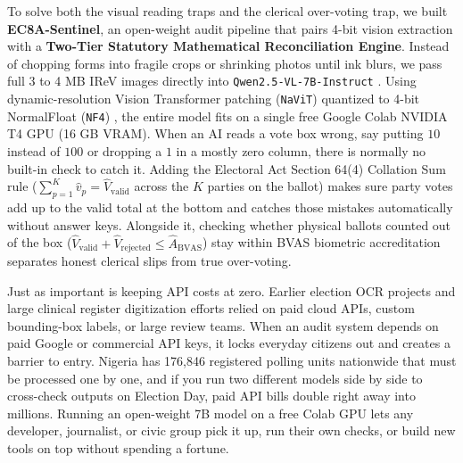 \documentclass{article}
\begin{document}
To solve both the visual reading traps and the clerical over-voting trap, we built \textbf{EC8A-Sentinel}, an open-weight audit pipeline that pairs 4-bit vision extraction with a \textbf{Two-Tier Statutory Mathematical Reconciliation Engine}. Instead of chopping forms into fragile crops or shrinking photos until ink blurs, we pass full 3 to 4 MB IReV images directly into \texttt{Qwen2.5-VL-7B-Instruct} \cite{bai2025qwen25vl}. Using dynamic-resolution Vision Transformer patching (\texttt{NaViT}) \cite{dehghani2023navit} quantized to 4-bit NormalFloat (\texttt{NF4}) \cite{dettmers2023qlora}, the entire model fits on a single free Google Colab NVIDIA T4 GPU (16 GB VRAM). When an AI reads a vote box wrong, say putting $10$ instead of $100$ or dropping a $1$ in a mostly zero column, there is normally no built-in check to catch it. Adding the Electoral Act Section 64(4) Collation Sum rule ($\sum_{p=1}^{K} \hat{v}_p = \hat{V}_{\text{valid}}$ across the $K$ parties on the ballot) \cite{inec2022electoral} makes sure party votes add up to the valid total at the bottom and catches those mistakes automatically without answer keys. Alongside it, checking whether physical ballots counted out of the box ($\hat{V}_{\text{valid}} + \hat{V}_{\text{rejected}} \le \hat{A}_{\text{BVAS}}$) stay within BVAS biometric accreditation separates honest clerical slips from true over-voting.

Just as important is keeping API costs at zero. Earlier election OCR projects \cite{kimani2022using,uwakwe2026ai,young2026irevsentinel} and large clinical register digitization efforts \cite{tweya2026digitising} relied on paid cloud APIs, custom bounding-box labels, or large review teams. When an audit system depends on paid Google or commercial API keys, it locks everyday citizens out and creates a barrier to entry. Nigeria has 176,846 registered polling units nationwide that must be processed one by one, and if you run two different models side by side to cross-check outputs on Election Day, paid API bills double right away into millions. Running an open-weight 7B model on a free Colab GPU lets any developer, journalist, or civic group pick it up, run their own checks, or build new tools on top without spending a fortune.
\end{document}
